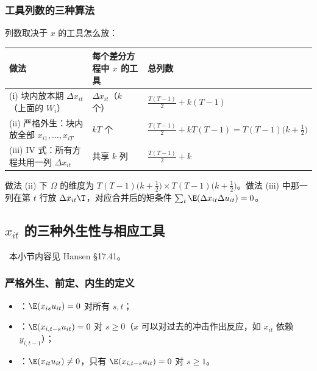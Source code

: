 \subsubsection{工具列数的三种算法}

列数取决于 $x$ 的工具怎么放：
\begin{center}
\small
\begin{tabularx}{\linewidth}{LLl}
\toprule
做法 & 每个差分方程中 $x$ 的工具 & 总列数\\
\midrule
(i) 块内放本期 $\Delta x_{it}$（上面的 $W_i$） & $\Delta x_{it}$（$k$ 个） & $\frac{T(T-1)}{2}+k(T-1)$\\
(ii) 严格外生：块内放全部 $x_{i1},\dots,x_{iT}$ & $kT$ 个 & $\frac{T(T-1)}{2}+kT(T-1)=T(T-1)\big(k+\frac12\big)$\\
(iii) IV 式：所有方程共用一列 $\Delta x_{it}$ & 共享 $k$ 列 & $\frac{T(T-1)}{2}+k$\\
\bottomrule
\end{tabularx}
\end{center}
做法 (ii) 下 $\Omega$ 的维度为 $T(T-1)\big(k+\frac12\big)\times T(T-1)\big(k+\frac12\big)$。做法 (iii) 中那一列在第 $t$ 行放 $\Delta x_{it}\T$，对应合并后的矩条件 $\sum_t\E(\Delta x_{it}\Delta u_{it})=0$。

\subsection{\texorpdfstring{$x_{it}$}{x\_it} 的三种外生性与相应工具}

\tagext\ 本小节内容见 Hansen §17.41。

\subsubsection{严格外生、前定、内生的定义}

\begin{defn}\label{def:U12b-exog}
\begin{itemize}
  \item {}：$\E(x_{is}u_{it})=0$ 对所有 $s,t$；
  \item {}：$\E(x_{i,t-s}u_{it})=0$ 对 $s\ge0$（$x$ 可以对过去的冲击作出反应，如 $x_{it}$ 依赖 $y_{i,t-1}$）；
  \item {}：$\E(x_{it}u_{it})\neq0$，只有 $\E(x_{i,t-s}u_{it})=0$ 对 $s\ge1$。
\end{itemize}
\end{defn}

